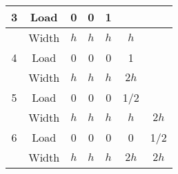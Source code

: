 \documentclass[review,12pt]{elsarticle}
\begin{document}
\begin{table}[htb!]
\begin{tabular}{|ccccccc|}
\multicolumn{1}{|c|}{\multirow{-2}{*}{3}} & \multicolumn{1}{c|}{Load}  & \multicolumn{1}{c|}{0}   & \multicolumn{1}{c|}{0}                        & \multicolumn{1}{c|}{1}                        & \multicolumn{1}{c|}{\cellcolor[HTML]{9B9B9B}}                        & \cellcolor[HTML]{9B9B9B}                        \\ \hline
\multicolumn{1}{|c|}{}                    & \multicolumn{1}{c|}{Width} & \multicolumn{1}{c|}{$h$} & \multicolumn{1}{c|}{$h$}                      & \multicolumn{1}{c|}{$h$}                      & \multicolumn{1}{c|}{$h$}                                             & \cellcolor[HTML]{9B9B9B}{\color[HTML]{9B9B9B} } \\ \cline{2-7} 
\multicolumn{1}{|c|}{\multirow{-2}{*}{4}} & \multicolumn{1}{c|}{Load}  & \multicolumn{1}{c|}{0}   & \multicolumn{1}{c|}{0}                        & \multicolumn{1}{c|}{0}                        & \multicolumn{1}{c|}{1}                                               & \cellcolor[HTML]{9B9B9B}                        \\ \hline
\multicolumn{1}{|c|}{}                    & \multicolumn{1}{c|}{Width} & \multicolumn{1}{c|}{$h$} & \multicolumn{1}{c|}{$h$}                      & \multicolumn{1}{c|}{$h$}                      & \multicolumn{1}{c|}{$2h$}                                            & \cellcolor[HTML]{9B9B9B}                        \\ \cline{2-7} 
\multicolumn{1}{|c|}{\multirow{-2}{*}{5}} & \multicolumn{1}{c|}{Load}  & \multicolumn{1}{c|}{0}   & \multicolumn{1}{c|}{0}                        & \multicolumn{1}{c|}{0}                        & \multicolumn{1}{c|}{1/2}                                             & \cellcolor[HTML]{9B9B9B}                        \\ \hline
\multicolumn{1}{|c|}{}                    & \multicolumn{1}{c|}{Width} & \multicolumn{1}{c|}{$h$} & \multicolumn{1}{c|}{$h$}                      & \multicolumn{1}{c|}{$h$}                      & \multicolumn{1}{c|}{$h$}                                             & $2h$                                            \\ \cline{2-7} 
\multicolumn{1}{|c|}{\multirow{-2}{*}{6}} & \multicolumn{1}{c|}{Load}  & \multicolumn{1}{c|}{0}   & \multicolumn{1}{c|}{0}                        & \multicolumn{1}{c|}{0}                        & \multicolumn{1}{c|}{0}                                               & 1/2                                             \\ \hline
\multicolumn{1}{|c|}{}                    & \multicolumn{1}{c|}{Width} & \multicolumn{1}{c|}{$h$} & \multicolumn{1}{c|}{$h$}                      & \multicolumn{1}{c|}{$h$}                      & \multicolumn{1}{c|}{$2h$}                                            & $2h$                                            \\ \cline{2-7} 

\end{tabular}
\end{table}
\end{document}
